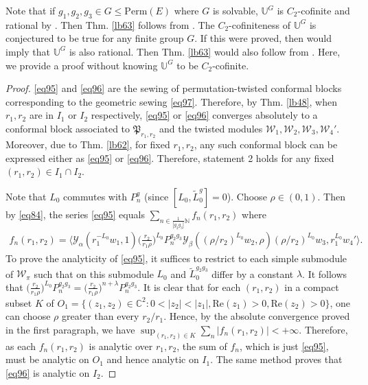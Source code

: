 \documentclass[12pt,a4paper,notitlepage]{article}
\theoremstyle{definition}
\theoremstyle{plain}
\newcommand{\fk}{\mathfrak}
\newcommand{\mc}{\mathcal}
\newcommand{\wtd}{\widetilde}
\newcommand{\bk}[1]{\langle {#1}\rangle}
\newcommand{\Ubb}{\mathbb U}
\newcommand{\Cbb}{\mathbb C}
\newcommand{\Nbb}{\mathbb N}
\newcommand{\Perm}{\mathrm{Perm}}
\numberwithin{equation}{subsection}
\begin{document}
Note that if $g_1,g_2,g_3\in G\leq\Perm(E)$ where $G$ is solvable, $\Ubb^G$ is $C_2$-cofinite and rational by \cite{Miy15,CM16}. Then Thm. \ref{lb63} follows from \cite{McR21}.  The $C_2$-cofiniteness  of $\Ubb^G$ is conjectured to be true for any finite group $G$. If this were proved, then \cite{McR21} would imply that $\Ubb^G$ is also rational. Then Thm. \ref{lb63} would also follow from \cite{McR21}. Here, we provide a proof without knowing $\Ubb^G$ to be $C_2$-cofinite.



\begin{proof}
\eqref{eq95} and \eqref{eq96} are the sewing of permutation-twisted conformal blocks corresponding to the geometric sewing \eqref{eq97}. Therefore, by Thm. \ref{lb48}, when $r_1,r_2$ are in $I_1$ or $I_2$ respectively, \eqref{eq95} or \eqref{eq96} converges absolutely to a conformal block associated to $\fk P_{r_1,r_2}$ and the twisted modules $\mc W_1,\mc W_2,\mc W_3,\mc W_4'$. Moreover, due to Thm. \ref{lb62}, for fixed $r_1,r_2$, any such conformal block can be expressed either as \eqref{eq95} or \eqref{eq96}. Therefore, statement 2 holds for any fixed $(r_1,r_2)\in I_1\cap I_2$.

Note that $L_0$ commutes with $P_n^g$ (since $[L_0,\wtd L_0^g]=0$). Choose $\rho\in (0,1)$. Then by \eqref{eq84}, the series \eqref{eq95} equals $\sum_{n\in\frac 1{|g_2g_3|}\Nbb}f_n(r_1,r_2)$ where
\begin{align*}
f_n(r_1,r_2)=\bk{\mc Y_\alpha(r_1^{-L_0}w_1,1)\Big(\frac{r_2}{r_1\rho}\Big)^{L_0}P_n^{g_2g_3}\mc Y_\beta((\rho/r_2)^{L_0}w_2,\rho)(\rho/r_2)^{L_0}w_3,r_1^{L_0}w_4'}.
\end{align*}
To prove the analyticity of \eqref{eq95}, it suffices to restrict to each simple submodule of $\mc W_\pi$ such that  on this submodule $L_0$ and $\wtd L_0^{g_2g_3}$ differ by a constant $\lambda$. It follows that $\big(\frac{r_2}{r_1\rho}\Big)^{L_0}P_n^{g_2g_3}=\big(\frac{r_2}{r_1\rho}\Big)^{n+\lambda}P_n^{g_2g_3}$. It is clear that for each $(r_1,r_2)$ in a compact subset $K$ of $O_1=\{(z_1,z_2)\in\Cbb^2:0<|z_2|<|z_1|,\mathrm{Re}(z_1)>0,\mathrm{Re}(z_2)>0\}$, one can choose $\rho$ greater than every $r_2/r_1$. Hence, by the absolute convergence proved in the first paragraph, we have $\sup_{(r_1,r_2)\in K}\sum_n |f_n(r_1,r_2)|<+\infty$. Therefore, as each $f_n(r_1,r_2)$ is analytic over $r_1,r_2$, the sum of $f_n$, which is just \eqref{eq95}, must be analytic on $O_1$ and hence analytic on $I_1$. The same method proves that \eqref{eq96} is analytic on $I_2$.


\end{proof}
\end{document}
